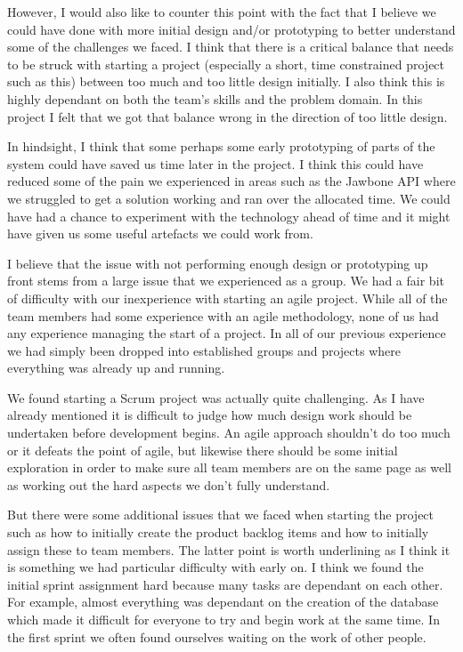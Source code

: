 \documentclass[paper=a4, fontsize=11pt]{scrartcl}	%
\numberwithin{equation}{section}															%
\numberwithin{figure}{section}																%
\numberwithin{table}{section}
\begin{document}
However, I would also like to counter this point with the fact that I believe we could have done with more initial design and/or prototyping to better understand some of the challenges we faced. I think that there is a critical balance that needs to be struck with starting a project (especially a short, time constrained project such as this) between too much and too little design initially. I also think this is highly dependant on both the team's skills and the problem domain. In this project I felt that we got that balance wrong in the direction of too little design.

In hindsight, I think that some perhaps some early prototyping of parts of the system could have saved us time later in the project. I think this could have reduced some of the pain we experienced in areas such as the Jawbone API where we struggled to get a solution working and ran over the allocated time. We could have had a chance to experiment with the technology ahead of time and it might have given us some useful artefacts we could work from. 

I believe that the issue with not performing enough design or prototyping up front stems from a large issue that we experienced as a group. We had a fair bit of difficulty with our inexperience with starting an agile project. While all of the team members had some experience with an agile methodology, none of us had any experience managing the start of a project. In all of our previous experience we had simply been dropped into established groups and projects where everything was already up and running. 

We found starting a Scrum project was actually quite challenging. As I have already mentioned it is difficult to judge how much design work should be undertaken before development begins. An agile approach shouldn't do too much or it defeats the point of agile, but likewise there should be some initial exploration in order to make sure all team members are on the same page as well as working out the hard aspects we don't fully understand. 

But there were some additional issues that we faced when starting the project such as how to initially create the product backlog items and how to initially assign these to team members. The latter point is worth underlining as I think it is something we had particular difficulty with early on. I think we found the initial sprint assignment hard because many tasks are dependant on each other. For example, almost everything was dependant on the creation of the database which made it difficult for everyone to try and begin work at the same time. In the first sprint we often found ourselves waiting on the work of other people. 
\end{document}
